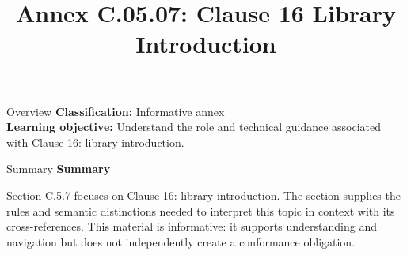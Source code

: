 \documentclass[10pt,letterpaper]{article}
\title{Annex C.05.07: Clause 16 Library Introduction}
\author{}
\date{}
\begin{document}
\maketitle
\begin{CornellOverviewBox}{Overview}
\textbf{Classification:} Informative annex\\[2pt]
\textbf{Learning objective:} Understand the role and technical guidance associated with Clause 16: library introduction.
\end{CornellOverviewBox}\begin{CornellSummaryBox}{Summary}
{\sffamily\bfseries\color{Accent} Summary}\par\vspace{3pt}Section C.5.7 focuses on Clause 16: library introduction. The section supplies the rules and semantic distinctions needed to interpret this topic in context with its cross-references. This material is informative: it supports understanding and navigation but does not independently create a conformance obligation.
\end{CornellSummaryBox}
\end{document}

